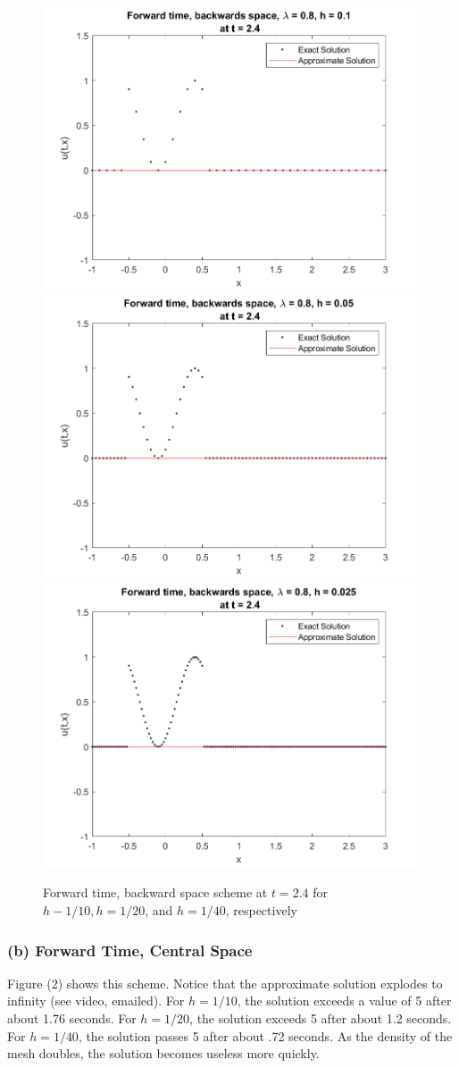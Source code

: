 \documentclass[12pt]{article}
\begin{document}
\begin{figure}
	\centering
	\includegraphics[width=.6\linewidth]{./code/a_forward_time_backward_space_h_one_10th.png}	\includegraphics[width=.6\linewidth]{./code/a_forward_time_backward_space_h_one_20th.png}
	\includegraphics[width=.6\linewidth]{./code/a_forward_time_backward_space_h_one_40th.png}
	\caption{Forward time, backward space scheme at $t=2.4$ for $h-1/10, h=1/20$, and $h=1/40$, respectively}
\end{figure}

\subsubsection*{(b) Forward Time, Central Space}

Figure (2) shows this scheme. Notice that the approximate solution explodes to infinity  (see video, emailed). For $h=1/10$, the solution exceeds a value of 5 after about 1.76 seconds. For $h=1/20$, the solution exceeds 5 after about 1.2 seconds. For $h=1/40$, the solution passes 5 after about .72 seconds. As the density of the mesh doubles, the solution becomes useless more quickly.
\end{document}
